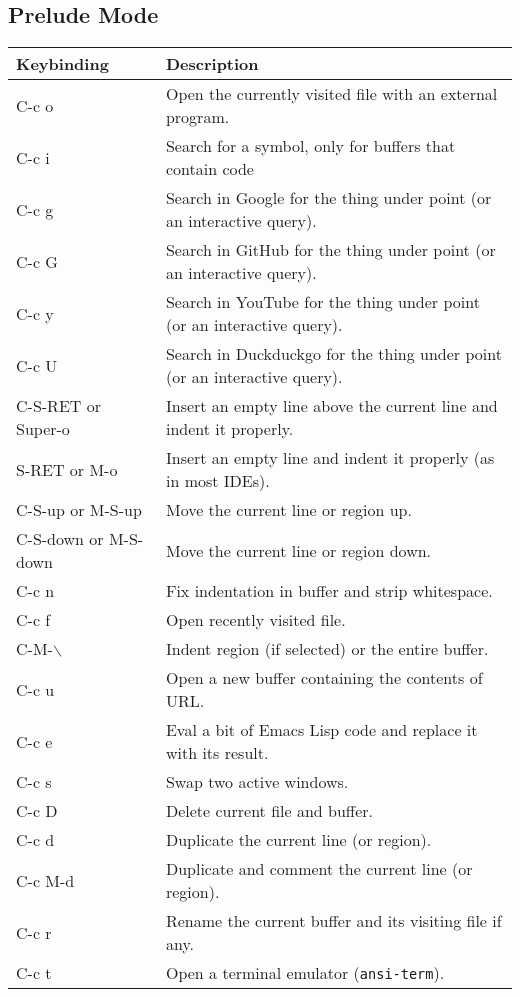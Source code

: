 \documentclass[11pt]{article}
\begin{document}
\subsection{Prelude Mode}
\label{sec:org471fb6e}
\begin{center}
\begin{tabular}{ll}
Keybinding & Description\\
\hline
C-c o & Open the currently visited file with an external program.\\
C-c i & Search for a symbol, only for buffers that contain code\\
C-c g & Search in Google for the thing under point (or an interactive query).\\
C-c G & Search in GitHub for the thing under point (or an interactive query).\\
C-c y & Search in YouTube for the thing under point (or an interactive query).\\
C-c U & Search in Duckduckgo for the thing under point (or an interactive query).\\
C-S-RET or Super-o & Insert an empty line above the current line and indent it properly.\\
S-RET or M-o & Insert an empty line and indent it properly (as in most IDEs).\\
C-S-up or M-S-up & Move the current line or region up.\\
C-S-down or M-S-down & Move the current line or region down.\\
C-c n & Fix indentation in buffer and strip whitespace.\\
C-c f & Open recently visited file.\\
C-M-$\backslash$ & Indent region (if selected) or the entire buffer.\\
C-c u & Open a new buffer containing the contents of URL.\\
C-c e & Eval a bit of Emacs Lisp code and replace it with its result.\\
C-c s & Swap two active windows.\\
C-c D & Delete current file and buffer.\\
C-c d & Duplicate the current line (or region).\\
C-c M-d & Duplicate and comment the current line (or region).\\
C-c r & Rename the current buffer and its visiting file if any.\\
C-c t & Open a terminal emulator (\texttt{ansi-term}).\\

\end{tabular}
\end{center}
\end{document}
